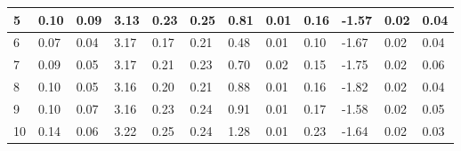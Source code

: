 \begin{table}[htbp]
{\begin{tabular}{|l|l|l|l|l|l|l|l|l|l|l|l|}
5 & 0.10 & 0.09 & 3.13 & 0.23 & 0.25 & 0.81 & 0.01 & 0.16 & -1.57 & 0.02 & 0.04 \\ \hline
6 & 0.07 & 0.04 & 3.17 & 0.17 & 0.21 & 0.48 & 0.01 & 0.10 & -1.67 & 0.02 & 0.04 \\ \hline
7 & 0.09 & 0.05 & 3.17 & 0.21 & 0.23 & 0.70 & 0.02 & 0.15 & -1.75 & 0.02 & 0.06 \\ \hline
8 & 0.10 & 0.05 & 3.16 & 0.20 & 0.21 & 0.88 & 0.01 & 0.16 & -1.82 & 0.02 & 0.04 \\ \hline
9 & 0.10 & 0.07 & 3.16 & 0.23 & 0.24 & 0.91 & 0.01 & 0.17 & -1.58 & 0.02 & 0.05 \\ \hline
10 & 0.14 & 0.06 & 3.22 & 0.25 & 0.24 & 1.28 & 0.01 & 0.23 & -1.64 & 0.02 & 0.03 \\ \hline
\end{tabular}%
}
\end{table}
\vspace{5cm}

\begin{table}[htbp]
\captionsetup{singlelinecheck=off}
\caption{Penamaan musik}
\label{tab:my-table}
\end{table}

